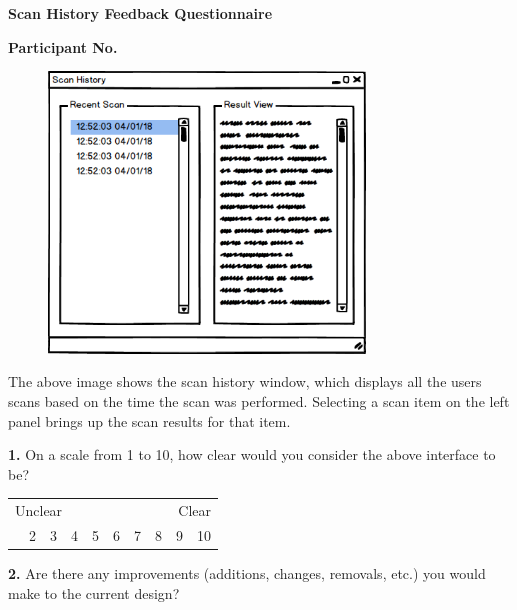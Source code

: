 \begin{center}
	\textbf{Scan History Feedback Questionnaire}\par
	\textbf{Participant No.}\par
\end{center}

\vspace{0.5cm}

\begin{figure}[h]
\begin{center}
	\includegraphics[width=0.75\textwidth]{img/scan_history_mockup.png}
\end{center}
\end{figure}

\vspace{0.5cm}

The above image shows the scan history window, which displays all the users scans based on the time the scan was
performed. Selecting a scan item on the left panel brings up the scan results for that item.

\vspace{0.5cm}

\textbf{1.} On a scale from 1 to 10, how clear would you consider the above interface to be?

\begin{center}
	\begin{table}[h]
	\label{my-label}
	\begin{tabularx}{\textwidth}{XXXXXXXXXX}
	\multicolumn{5}{l}{Unclear} & \multicolumn{5}{r}{Clear} \\
	\centering
	1    & 2    & 3    & 4    & 5    & 6   & 7   & 8   & 9  & 10
	\end{tabularx}
	\end{table}
\end{center}

\textbf{2.} Are there any improvements (additions, changes, removals, etc.) you would make to the current design?

\vspace{5cm}
